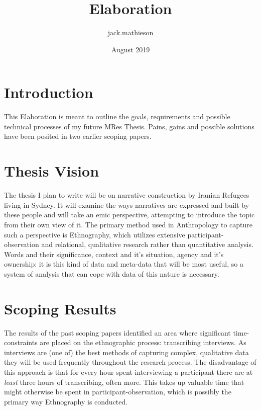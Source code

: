 \documentclass{article}
\title{Elaboration}
\author{jack.mathieson }
\date{August 2019}
\begin{document}
\maketitle

\tableofcontents
\section{Introduction}
    This Elaboration is meant to outline the goals, requirements and possible technical processes of my future MRes Thesis. Pains, gains and possible solutions have been posited in two earlier scoping papers. 

\section{Thesis Vision}

    The thesis I plan to write will be on narrative construction by Iranian Refugees living in Sydney. It will examine the ways narratives are expressed and built by these people and will take an emic perspective, attempting to introduce the topic from their own view of it. The primary method used in Anthropology to capture such a perspective is Ethnography, which utilizes extensive participant-observation and relational, qualitative research rather than quantitative analysis. Words and their significance, context and it's situation, agency and it's ownership: it is this kind of data and meta-data that will be most useful, so a system of analysis that can cope with data of this nature is necessary.
    
\section{ Scoping Results}

The results of the past scoping papers identified an area where significant time-constraints are placed on the ethnographic process: transcribing interviews. As interviews are (one of) the best methods of capturing complex, qualitative data they will be used frequently throughout the research process. The disadvantage of this approach is that for every hour spent interviewing a participant there are at \textit{least} three hours of transcribing, often more. This takes up valuable time that might otherwise be spent in participant-observation, which is possibly the primary way
Ethnography is conducted.
\end{document}
